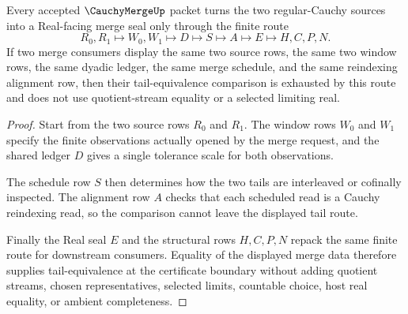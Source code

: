 \begin{theorem}
\label{thm:cauchy-merge-tail-equivalence-route}
Every accepted $\CauchyMergeUp$ packet turns the two regular-Cauchy sources into a Real-facing merge seal only through the finite route
$$
R_0,R_1 \longmapsto W_0,W_1 \longmapsto D \longmapsto S \longmapsto A \longmapsto E \longmapsto H,C,P,N .
$$
If two merge consumers display the same two source rows, the same two window rows, the same dyadic ledger, the same merge schedule, and the same reindexing alignment row, then their tail-equivalence comparison is exhausted by this route and does not use quotient-stream equality or a selected limiting real.
\end{theorem}
\begin{proof}
Start from the two source rows $R_0$ and $R_1$. The window rows $W_0$ and $W_1$ specify the finite observations actually opened by the merge request, and the shared ledger $D$ gives a single tolerance scale for both observations.

The schedule row $S$ then determines how the two tails are interleaved or cofinally inspected. The alignment row $A$ checks that each scheduled read is a Cauchy reindexing read, so the comparison cannot leave the displayed tail route.

Finally the Real seal $E$ and the structural rows $H,C,P,N$ repack the same finite route for downstream consumers. Equality of the displayed merge data therefore supplies tail-equivalence at the certificate boundary without adding quotient streams, chosen representatives, selected limits, countable choice, host real equality, or ambient completeness.
\end{proof}



